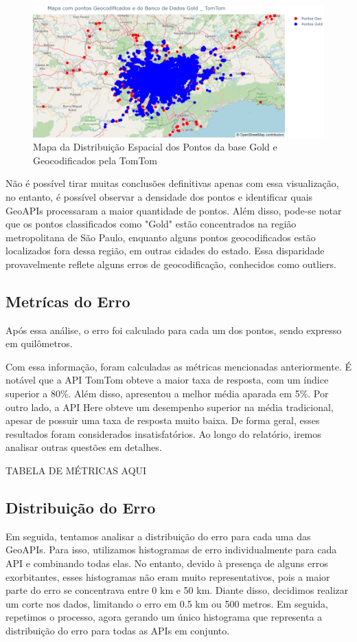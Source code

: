 \documentclass{article}
\begin{document}
\begin{figure}[ht]
  \centering
  \includegraphics[width=\textwidth]{mapapontos3.png}
  \caption{Mapa da Distribuição Espacial dos Pontos da base Gold e Geocodificados pela TomTom}
  \label{fig:mapapontos3}
\end{figure}

Não é possível tirar muitas conclusões definitivas apenas com essa visualização, no entanto, é possível observar a densidade dos pontos e identificar quais GeoAPIs processaram a maior quantidade de pontos. Além disso, pode-se notar que os pontos classificados como "Gold" estão concentrados na região metropolitana de São Paulo, enquanto alguns pontos geocodificados estão localizados fora dessa região, em outras cidades do estado. Essa disparidade provavelmente reflete alguns erros de geocodificação, conhecidos como outliers.

\subsection{Metrícas do Erro}
Após essa análise, o erro foi calculado para cada um dos pontos, sendo expresso em quilômetros.

Com essa informação, foram calculadas as métricas mencionadas anteriormente. É notável que a API TomTom obteve a maior taxa de resposta, com um índice superior a 80\%. Além disso, apresentou a melhor média aparada em 5\%. Por outro lado, a API Here obteve um desempenho superior na média tradicional, apesar de possuir uma taxa de resposta muito baixa. De forma geral, esses resultados foram considerados insatisfatórios. Ao longo do relatório, iremos analisar outras questões em detalhes.

TABELA DE MÉTRICAS AQUI

\subsection{Distribuição do Erro}
Em seguida, tentamos analisar a distribuição do erro para cada uma das GeoAPIs. Para isso, utilizamos histogramas de erro individualmente para cada API e combinando todas elas. No entanto, devido à presença de alguns erros exorbitantes, esses histogramas não eram muito representativos, pois a maior parte do erro se concentrava entre 0 km e 50 km. Diante disso, decidimos realizar um corte nos dados, limitando o erro em 0.5 km ou 500 metros. Em seguida, repetimos o processo, agora gerando um único histograma que representa a distribuição do erro para todas as APIs em conjunto.
\end{document}
